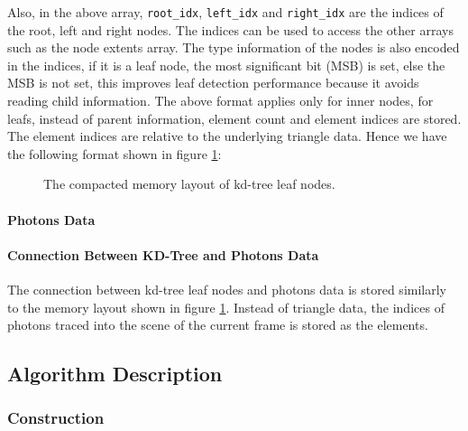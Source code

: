 Also, in the above array, {\tt root\_idx}, {\tt left\_idx} and {\tt right\_idx} are the indices of the root, left and right nodes. The indices can be used to access the other arrays such as the node extents array. The type information of the nodes is also encoded in the indices, if it is a leaf node, the most significant bit (MSB) is set, else the MSB is not set, this improves leaf detection performance because it avoids reading child information. The above format applies only for inner nodes, for leafs, instead of parent information, element count and element indices are stored. The element indices are relative to the underlying triangle data. Hence we have the following format shown in figure \ref{fig:kdtree_leaf_memory_layout}:

\begin{figure}[htp]
    \centering
    \renewcommand{\thefigure}{\thechapter.\arabic{figure}}
    \caption[Compacted memory layout of kd-tree leaf nodes]{The compacted memory layout of kd-tree leaf nodes.}
    \label{fig:kdtree_leaf_memory_layout}
\end{figure}

\paragraph{Photons Data}

\paragraph{Connection Between KD-Tree and Photons Data}

The connection between kd-tree leaf nodes and photons data is stored similarly to the memory layout shown in figure \ref{fig:kdtree_leaf_memory_layout}. Instead of triangle data, the indices of photons traced into the scene of the current frame is stored as the elements.


\subsection{Algorithm Description}

\subsubsection{Construction}


